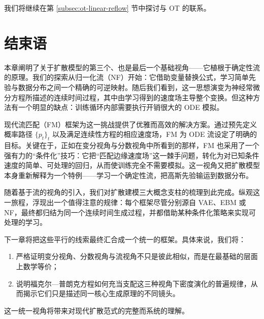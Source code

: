 我们将继续在第 \ref{subsec:ot-linear-reflow} 节中探讨与 OT 的联系。


\section{结束语}\label{sec:ch4_cr}

本章阐明了关于扩散模型的第三个、也是最后一个基础视角——它植根于确定性流的原理。我们的探索从归一化流（NF）开始：它借助变量替换公式，学习简单先验与数据分布之间一个精确的可逆映射。随后我们看到，这一思想演变为神经常微分方程所描述的连续时间过程，其中由学习得到的速度场主导整个变换。但这种方法有一个明显的缺点：训练循环内部需要执行开销很大的 ODE 模拟。


现代流匹配（FM）框架为这一挑战提供了优雅而高效的解决方案。通过预先定义概率路径 $\{p_{t}\}_t$ 以及满足连续性方程的相应速度场，FM 为 ODE 流设定了明确的目标。关键在于，正如在变分视角与分数视角中所看到的那样，FM 也采用了一个强有力的“条件化”技巧：它把“匹配边缘速度场”这一棘手问题，转化为对已知条件速度的简单、可处理的回归，从而使训练完全不需要模拟。这一视角又把扩散模型本身重新解释为一个特例——学习一个确定性流，把高斯先验输运到数据分布。


随着基于流的视角的引入，我们对扩散建模三大概念支柱的梳理到此完成。纵观这一旅程，浮现出一个值得注意的规律：每个框架尽管分别源自 VAE、EBM 或 NF，最终都归结为同一个连续时间生成过程，并都借助某种条件化策略来实现可处理的学习。

下一章将把这些平行的线索最终汇合成一个统一的框架。具体来说，我们将：
\begin{enumerate}
    \item 严格证明变分视角、分数视角与流视角不只是彼此相似，而是在最基础的层面上数学等价；
    \item 说明福克尔—普朗克方程如何充当支配这三种视角下密度演化的普遍规律，从而揭示它们只是描述同一核心生成原理的不同镜头。
\end{enumerate}

这一统一视角将带来对现代扩散范式的完整而系统的理解。
